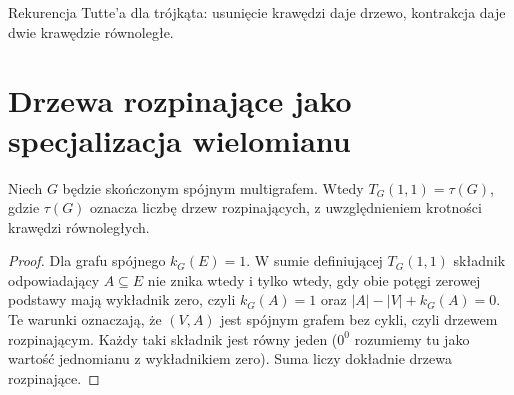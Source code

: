 \begin{center}

{\footnotesize Rekurencja Tutte'a dla trójkąta: usunięcie krawędzi
daje drzewo, kontrakcja daje dwie krawędzie równoległe.}
\end{center}

\section{Drzewa rozpinające jako specjalizacja wielomianu}
\label{sec:tg-tutte-trees}

\begin{twierdzenie}[Wartość $T_G(1,1)$]
Niech $G$ będzie skończonym spójnym multigrafem.
Wtedy $T_G(1,1)=\tau(G)$, gdzie $\tau(G)$ oznacza
liczbę drzew rozpinających, z uwzględnieniem krotności
krawędzi równoległych.
\end{twierdzenie}

\begin{proof}
Dla grafu spójnego $k_G(E)=1$. W sumie definiującej
$T_G(1,1)$ składnik odpowiadający $A\subseteq E$
nie znika wtedy i tylko wtedy, gdy obie potęgi zerowej
podstawy mają wykładnik zero, czyli
$k_G(A)=1$ oraz $|A|-|V|+k_G(A)=0$.
Te warunki oznaczają, że $(V,A)$ jest spójnym grafem
bez cykli, czyli drzewem rozpinającym. Każdy taki
składnik jest równy jeden ($0^0$ rozumiemy tu
jako wartość jednomianu z wykładnikiem zero).
Suma liczy dokładnie drzewa rozpinające.
\end{proof}

